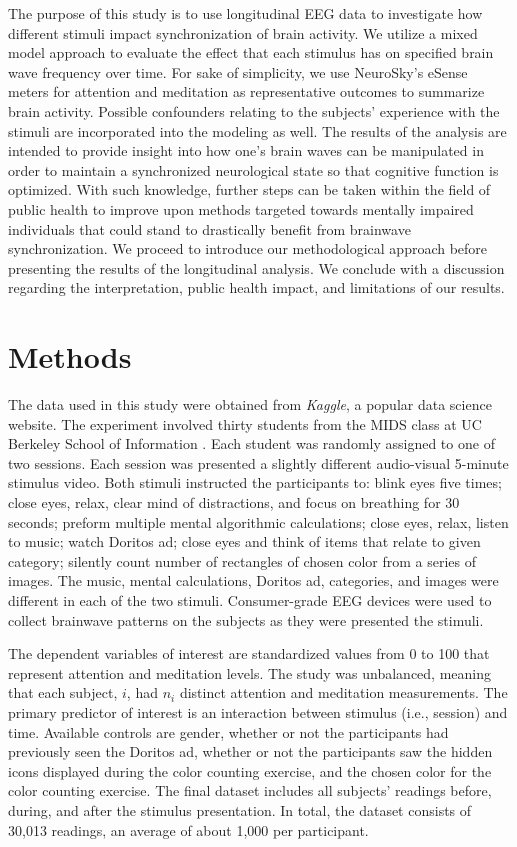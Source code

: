\documentclass{article}[12pt]
\begin{document}
The purpose of this study is to use longitudinal EEG data to investigate how different stimuli impact synchronization of brain activity. We utilize a mixed model approach to evaluate the effect that each stimulus has on specified brain wave frequency over time.  For sake of simplicity, we use NeuroSky's eSense meters for attention and meditation as representative outcomes to summarize brain activity.  Possible confounders relating to the subjects' experience with the stimuli are incorporated into the modeling as well.  The results of the analysis are intended to provide insight into how one's brain waves can be manipulated in order to maintain a synchronized neurological state so that cognitive function is optimized. With such knowledge, further steps can be taken within the field of public health to improve upon methods targeted towards mentally impaired individuals that could stand to drastically benefit from brainwave synchronization. We proceed to introduce our methodological approach before presenting the results of the longitudinal analysis. We conclude with a discussion regarding the interpretation, public health impact, and limitations of our results.


\section{Methods}

The data used in this study were obtained from \textit{Kaggle}, a popular data science website.
The experiment involved thirty students from the MIDS class at UC Berkeley School of Information \cite{data}. Each student was randomly assigned to one of two sessions. Each session was presented a slightly different audio-visual 5-minute stimulus video. Both stimuli instructed the participants to: blink eyes five times; close eyes, relax, clear mind of distractions, and focus on breathing for 30 seconds; preform multiple mental algorithmic calculations; close eyes, relax, listen to music; watch Doritos ad; close eyes and think of items that relate to given category; silently count number of rectangles of chosen color from a series of images. The music, mental calculations, Doritos ad, categories, and images were different in each of the two stimuli. Consumer-grade EEG devices were used to collect brainwave patterns on the subjects as they were presented the stimuli. 

The dependent variables of interest are standardized values from 0 to 100 that represent attention and meditation levels. The study was unbalanced, meaning that each subject, $i$, had $n_i$ distinct attention and meditation measurements. The primary predictor of interest is an interaction between stimulus (i.e., session) and time. Available controls are gender, whether or not the participants had previously seen the Doritos ad, whether or not the participants saw the hidden icons displayed during the color counting exercise, and the chosen color for the color counting exercise. The final dataset includes all subjects’ readings before, during, and after the stimulus presentation. In total, the dataset consists of 30,013 readings, an average of about 1,000 per participant.
\end{document}
